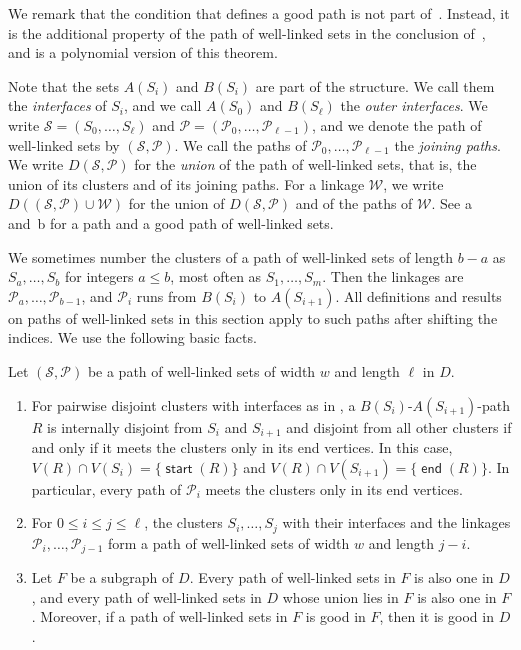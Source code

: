 \documentclass[fontsize=12pt,leading=14pt]{fullpaper}
\DeclareMathOperator{\st}{\mathsf{start}}
\DeclareMathOperator{\en}{\mathsf{end}}
\newcommand{\Pcal}{\mathcal{P}}
\newcommand{\Scal}{\mathcal{S}}
\newcommand{\Wcal}{\mathcal{W}}
\begin{document}
We remark that the condition that defines a good path is not part of~\cite[Definition~8.1]{HKMM26a}.
Instead, it is the additional property of the path of well-linked sets in the conclusion of~\cite[Theorem~9.9]{HKMM26a}, and  is a polynomial version of this theorem.

Note that the sets $A(S_i)$ and $B(S_i)$ are part of the structure.
We call them the \emph{interfaces} of $S_i$, and we call $A(S_0)$ and $B(S_\ell)$ the \emph{outer interfaces}.
We write $\Scal=(S_0,\dots,S_\ell)$ and $\Pcal=(\Pcal_0,\dots,\Pcal_{\ell-1})$, and we denote the path of well-linked sets by $(\Scal,\Pcal)$.
We call the paths of $\Pcal_0,\dots,\Pcal_{\ell-1}$ the \emph{joining paths}.
We write $D(\Scal,\Pcal)$ for the \emph{union} of the path of well-linked sets, that is, the union of its clusters and of its joining paths.
For a linkage $\Wcal$, we write $D((\Scal,\Pcal)\cup\Wcal)$ for the union of $D(\Scal,\Pcal)$ and of the paths of $\Wcal$.
See a and~b for a path and a good path of well-linked sets.

We sometimes number the clusters of a path of well-linked sets of length $b-a$ as $S_a,\dots,S_b$ for integers $a\le b$, most often as $S_1,\dots,S_m$.
Then the linkages are $\Pcal_a,\dots,\Pcal_{b-1}$, and $\Pcal_i$ runs from $B(S_i)$ to $A(S_{i+1})$.
All definitions and results on paths of well-linked sets in this section apply to such paths after shifting the indices.
We use the following basic facts.

\begin{observation}\label{obs:wl-basic}
  Let $(\Scal,\Pcal)$ be a path of well-linked sets of width $w$ and length $\ell$ in $D$.
  \begin{enumerate}[label=\textnormal{(\roman*)}]
    \item\label{item:wl-meet} For pairwise disjoint clusters with interfaces as in , a $B(S_i)$-$A(S_{i+1})$-path $R$ is internally disjoint from $S_i$ and $S_{i+1}$ and disjoint from all other clusters if and only if it meets the clusters only in its end vertices.
      In this case, $V(R)\cap V(S_i)=\{\st(R)\}$ and $V(R)\cap V(S_{i+1})=\{\en(R)\}$.
      In particular, every path of $\Pcal_i$ meets the clusters only in its end vertices.
    \item\label{item:wl-sub} For $0\le i\le j\le\ell$, the clusters $S_i,\dots,S_j$ with their interfaces and the linkages $\Pcal_i,\dots,\Pcal_{j-1}$ form a path of well-linked sets of width $w$ and length $j-i$.
    \item\label{item:wl-super} Let $F$ be a subgraph of $D$.
      Every path of well-linked sets in $F$ is also one in $D$, and every path of well-linked sets in $D$ whose union lies in $F$ is also one in $F$.
      Moreover, if a path of well-linked sets in $F$ is good in $F$, then it is good in $D$.
  \end{enumerate}
\end{observation}
\end{document}

